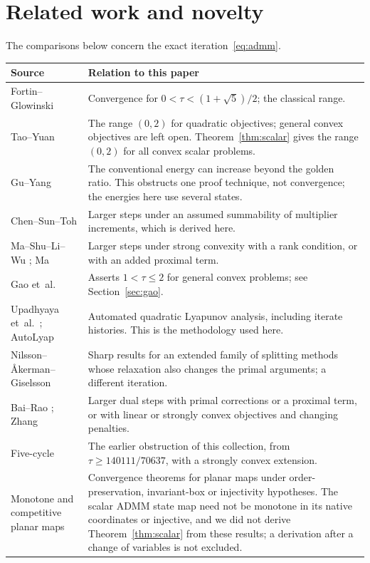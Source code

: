 \documentclass[11pt]{article}
\numberwithin{equation}{section}
\theoremstyle{definition}
\theoremstyle{remark}
\begin{document}
\section{Related work and novelty}\label{sec:related}
The comparisons below concern the exact iteration~\eqref{eq:admm}.
\begin{longtable}{@{}p{}p{}@{}}
\toprule
Source&Relation to this paper\\
\midrule\endhead
Fortin--Glowinski \cite{FortinGlowinski}&Convergence for $0<\tau<(1+\sqrt5)/2$; the classical range.\\
Tao--Yuan \cite{TaoYuan}&The range $(0,2)$ for quadratic objectives; general convex objectives are left open. Theorem~\ref{thm:scalar} gives the range $(0,2)$ for all convex scalar problems.\\
Gu--Yang \cite{GuYang}&The conventional energy can increase beyond the golden ratio. This obstructs one proof technique, not convergence; the energies here use several states.\\
Chen--Sun--Toh \cite{ChenSunToh}&Larger steps under an assumed summability of multiplier increments, which is derived here.\\
Ma--Shu--Li--Wu \cite{MaShuLiWu}; Ma \cite{Ma2020}&Larger steps under strong convexity with a rank condition, or with an added proximal term.\\
Gao et~al.\ \cite{Gao2022}&Asserts $1<\tau\le2$ for general convex problems; see Section~\ref{sec:gao}.\\
Upadhyaya et~al.\ \cite{UpadhyayaTight}; AutoLyap \cite{AutoLyap}&Automated quadratic Lyapunov analysis, including iterate histories. This is the methodology used here.\\
Nilsson--\AA kerman--Giselsson \cite{Nilsson}&Sharp results for an extended family of splitting methods whose relaxation also changes the primal arguments; a different iteration.\\
Bai--Rao \cite{BaiRao}; Zhang \cite{Zhang}&Larger dual steps with primal corrections or a proximal term, or with linear or strongly convex objectives and changing penalties.\\
Five-cycle \cite{FiveCycle}&The earlier obstruction of this collection, from $\tau\ge140111/70637$, with a strongly convex extension.\\
Monotone and competitive planar maps \cite{HirschSmith,KulenovicMerino}&Convergence theorems for planar maps under order-preservation, invariant-box or injectivity hypotheses. The scalar ADMM state map need not be monotone in its native coordinates or injective, and we did not derive Theorem~\ref{thm:scalar} from these results; a derivation after a change of variables is not excluded.\\
\bottomrule
\end{longtable}
\end{document}

